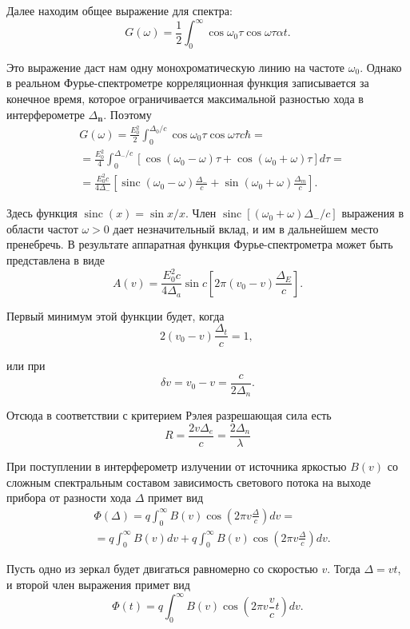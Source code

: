 \documentclass[a4paper, 12pt]{article}%
\begin{document}
	Далее находим общее выражение для спектра:
	$$
	G(\omega)=\frac{1}{2} \int_0^{\infty} \cos \omega_0 \tau \cos \omega \tau \alpha t .
	$$
	
	Это выражение даст нам одну монохроматическую линию на частоте $\omega_0$. Однако в реальном Фурье-спектрометре корреляционная функция записывается за конечное время, которое ограничивается максимальной разностью хода в интерферометре $\Delta_{\boldsymbol{n}}$. Поэтому 
	$$
	\begin{aligned}
		& G(\omega)=\frac{E_0^2}{2} \int_0^{\Delta_0 / c} \cos \omega_0 \tau \cos \omega \tau c \hbar= \\
		& =\frac{E_0^2}{4} \int_0^{\Delta_{-} / c}\left[\cos \left(\omega_0-\omega\right) \tau+\cos \left(\omega_0+\omega\right) \tau\right] d \tau= \\
		& =\frac{E_0^2 c}{4 \Delta_{-}}\left[\operatorname{sinc}\left(\omega_0-\omega\right) \frac{\Delta_{-}}{c}+\sin \left(\omega_0+\omega\right) \frac{\Delta_m}{c}\right] .
	\end{aligned}
	$$
	
	Здесь функция $\operatorname{sinc}(x)=\sin x / x$.
	Член $\operatorname{sinc}\left[\left(\omega_0+\omega\right) \Delta_{-} / c\right]$ выражения в области частот $\omega>0$ дает незначительный вклад, и им в дальнейшем место пренебречь. В результате аппаратная функция Фурье-спектрометра может быть представлена в виде
	$$
	A(v)=\frac{E_0^2 c}{4 \Delta_a} \sin c\left[2 \pi\left(v_0-v\right) \frac{\Delta_E}{c}\right] .
	$$
	
	Первый минимум этой функции будет, когда
	$$
	2\left(v_0-v\right) \frac{\Delta_t}{c}=1 \text {, }
	$$
	
	или при
	$$
	\delta v=v_0-v=\frac{c}{2 \Delta_n} .
	$$
	
	Отсюда в соответствии с критерием Рэлея разрешающая сила есть
	$$
	R =\frac{2 v \Delta_e}{c}=\frac{2 \Delta_n}{\lambda}
	$$
	
	
	При поступлении в интерферометр излучении от источника яркостью $B(v)$ со сложным спектральным составом зависимость светового потока на выходе прибора от разности хода $\Delta$ примет вид
	$$
	\begin{aligned}
		& \Phi(\Delta)=q \int_0^{\infty} B(v) \cos \left(2 \pi v \frac{\Delta}{c}\right) d v= \\
		& =q \int_0^{\infty} B(v) d v+q \int_0^{\infty} B(v) \cos \left(2 \pi v \frac{\Delta}{c}\right) d v .
	\end{aligned}
	$$
	
	Пусть одно из зеркал будет двигаться равномерно со скоростью $v$. Тогда $\Delta=v t$, и второй член выражения примет вид
	$$
	\Phi(t)=q \int_0^{\infty} B(v) \cos \left(2 \pi v \frac{v}{c} t\right) d v .
	$$
	
\end{document}
